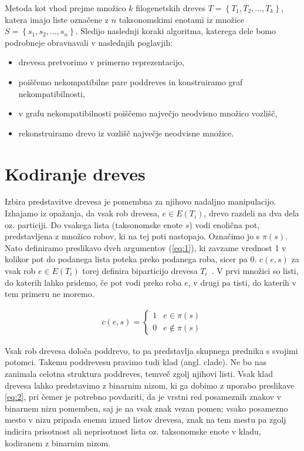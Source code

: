 \documentclass[a4paper, 12pt]{book}
\begin{document}
Metoda kot vhod prejme množico $k$ filogenetskih dreves $T = \left\{ {T_1, T_2, ..., T_k} \right\}$, katera imajo liste označene z $n$ taksonomskimi enotami iz množice $S = \left\{ {s_1, s_2, ..., s_n} \right\}$. Sledijo naslednji koraki algoritma, katerega dele bomo podrobneje obravnavali v naslednjih poglavjih:
\begin{itemize}
	\item drevesa pretvorimo v primerno reprezentacijo,
	\item poiščemo nekompatibilne pare poddreves in konstruiramo graf nekompatibilnosti,
	\item v grafu nekompatibilnosti poiščemo največjo neodvisno množico vozlišč,
	\item rekonstruiramo drevo iz vozlišč največje neodvisne množice.
\end{itemize}

\section{Kodiranje dreves}
Izbira predstavitve drevesa je pomembna za njihovo nadaljno manipulacijo. Izhajamo iz opažanja, da vsak rob drevesa, $e \in E(T_i)$, drevo razdeli na dva dela oz. particiji. Do vsakega lista (taksonomske enote $s$) vodi enolična pot, predstavljena z množico robov, ki na tej poti nastopajo. Označimo jo s $\pi(s)$. Nato definiramo preslikavo dveh argumentov (\ref{eq:1}), ki zavzame vrednost 1 v kolikor pot do podanega lista poteka preko podanega roba, sicer pa 0. $c(e, s)$ za vsak rob $e \in E(T_i)$ torej definira biparticijo drevesa $T_i$~\cite{pw}. V prvi množici so listi, do katerih lahko pridemo, če pot vodi preko roba $e$, v drugi pa tisti, do katerih v tem primeru ne moremo.

\begin{align}
	c(e, s) = 
	\left\{
		\begin{array}{ll}
			1 & e \in \pi(s) \\
			0 & e \notin \pi(s)
		\end{array}
	\right.
	\label{eq:1}
\end{align}

Vsak rob drevesa določa poddrevo, to pa predstavlja skupnega prednika s svojimi potomci. Takemu poddrevesu pravimo tudi klad (angl. clade). Ne bo nas zanimala celotna struktura poddreves, temveč zgolj njihovi listi. Vsak klad drevesa lahko predstavimo z binarnim nizom, ki ga dobimo z uporabo preslikave \ref{eq:2}, pri čemer je potrebno povdariti, da je vrstni red posameznih znakov v binarnem nizu pomemben, saj je na vsak znak vezan pomen; vsako posamezno mesto v nizu pripada enemu izmed listov drevesa, znak na tem mestu pa zgolj indicira prisotnost ali neprisotnost lista oz. taksonomske enote v kladu, kodiranem z binarnim nizom.
\end{document}
